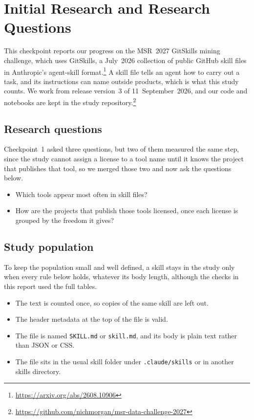 \section{Initial Research and Research Questions}

This checkpoint reports our progress on the MSR~2027 GitSkills mining challenge, which uses GitSkills, a July~2026 collection of public GitHub skill files in Anthropic's agent-skill format.\footnote{\url{https://arxiv.org/abs/2608.10906}}
A skill file tells an agent how to carry out a task, and its instructions can name outside products, which is what this study counts.
We work from release version~3 of 11~September~2026, and our code and notebooks are kept in the study repository.\footnote{\url{https://github.com/nichmorgan/msr-data-challenge-2027}}

\subsection{Research questions}

Checkpoint~1 asked three questions, but two of them measured the same step, since the study cannot assign a license to a tool name until it knows the project that publishes that tool, so we merged those two and now ask the questions below.

\begin{itemize}
    \item Which tools appear most often in skill files?
    \item How are the projects that publish those tools licensed, once each license is grouped by the freedom it gives?
\end{itemize}

\subsection{Study population}

To keep the population small and well defined, a skill stays in the study only when every rule below holds, whatever its body length, although the checks in this report used the full tables.

\begin{itemize}
    \item The text is counted once, so copies of the same skill are left out.
    \item The header metadata at the top of the file is valid.
    \item The file is named \texttt{SKILL.md} or \texttt{skill.md}, and its body is plain text rather than JSON or CSS.
    \item The file sits in the usual skill folder under \texttt{.claude/skills} or in another skills directory.
\end{itemize}

